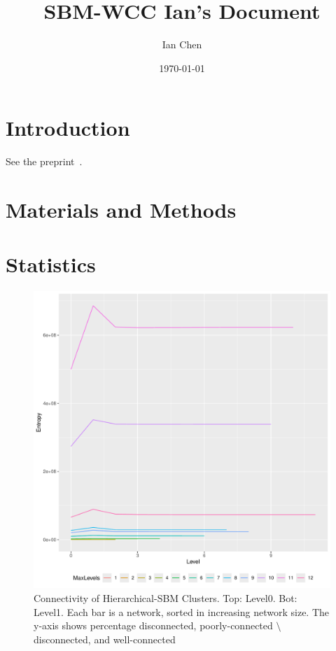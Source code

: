 \documentclass[aps,pre,superscriptaddress]{revtex4}
\begin{document}

\title{SBM-WCC Ian's Document}
\author{Ian Chen}
\date{\today}
\maketitle

\section{Introduction}
See the preprint~\cite{Park25-02}.

\section{Materials and Methods}

\section{Statistics}

\begin{figure}[ht]
	\includegraphics[width=\textwidth]{fig1.pdf}
	\caption{Connectivity of Hierarchical-SBM Clusters. Top: Level0. Bot: Level1.
		Each bar is a network, sorted in increasing network size.
		The y-axis shows percentage disconnected, poorly-connected $\setminus$ disconnected, and well-connected}
	\label{figs:fig1}
\end{figure}
\end{document}
